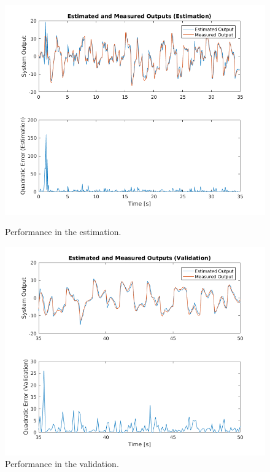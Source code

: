 \documentclass[12pt]{article}
\begin{document}
\begin{figure}[H]
	\centering
	\begin{minipage}{.5\textwidth}
		\centering
		\includegraphics[keepaspectratio=true, scale=0.3]{images/arx1_performance_estimation.png}
		\caption{Performance in the estimation.}
		\label{arx1_performance_estimation}
	\end{minipage}%
	\begin{minipage}{.5\textwidth}
		\centering
		\includegraphics[keepaspectratio=true, scale=0.3]{images/arx1_performance_validation.png}
		\caption{Performance in the validation.}
		\label{arx1_performance_validation}
	\end{minipage}
\end{figure}
\end{document}
